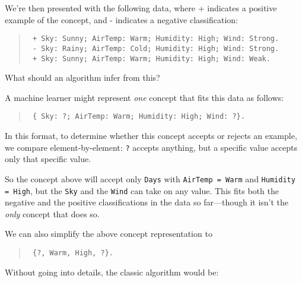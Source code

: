 {
 We're then presented with the following data,
where + indicates a positive example of the concept, and - indicates a
negative classification:}

\begin{verse}
\texttt{ + Sky: Sunny; AirTemp: Warm; Humidity: High; Wind: Strong. } \\
\texttt{ - Sky: Rainy; AirTemp: Cold; Humidity: High; Wind: Strong. } \\
\texttt{ + Sky: Sunny; AirTemp: Warm; Humidity: High; Wind: Weak. } \\
\end{verse}

{
 What should an algorithm infer from this?}

{
 A machine learner might represent \textit{one} concept that fits
this data as follows:}

\begin{verse}
  \texttt{ \{ Sky: ?; AirTemp: Warm; Humidity: High; Wind: ?\}. }\\
\end{verse}

{
 In this format, to determine whether this concept accepts or
rejects an example, we compare element-by-element: \texttt{?} accepts anything,
but a specific value accepts only that specific value.}

{
 So the concept above will accept only \texttt{Days} with \texttt{AirTemp = Warm} and
\texttt{Humidity = High}, but the \texttt{Sky} and the \texttt{Wind} can take on any value. This
fits both the negative and the positive classifications in the data so
far---though it isn't the \textit{only} concept that
does so.}

{
 We can also simplify the above concept representation to}

\begin{verse}
\texttt{ \{?, Warm, High, ?\}.}
\end{verse}


{
 Without going into details, the classic algorithm would be:}

